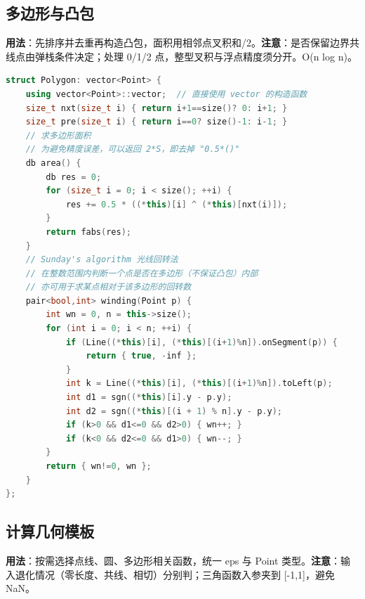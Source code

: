 \documentclass[a4paper,9pt]{extarticle}
\begin{document}
\subsection{多边形与凸包}

\textbf{用法}：先排序并去重再构造凸包，面积用相邻点叉积和/\allowbreak{}2。\textbf{注意}：是否保留边界共线点由弹栈条件决定；处理 0/\allowbreak{}1/\allowbreak{}2 点，整型叉积与浮点精度须分开。O(\allowbreak{}n log n)。

\begin{lstlisting}[language={C++}]
struct Polygon: vector<Point> {
    using vector<Point>::vector;  // 直接使用 vector 的构造函数
    size_t nxt(size_t i) { return i+1==size()? 0: i+1; }
    size_t pre(size_t i) { return i==0? size()-1: i-1; }
	// 求多边形面积
	// 为避免精度误差，可以返回 2*S，即去掉 "0.5*()"
	db area() {
        db res = 0;
        for (size_t i = 0; i < size(); ++i) {
            res += 0.5 * ((*this)[i] ^ (*this)[nxt(i)]);
        }
        return fabs(res);
    }
    // Sunday's algorithm 光线回转法
    // 在整数范围内判断一个点是否在多边形（不保证凸包）内部
    // 亦可用于求某点相对于该多边形的回转数
    pair<bool,int> winding(Point p) {
        int wn = 0, n = this->size();
        for (int i = 0; i < n; ++i) {
            if (Line((*this)[i], (*this)[(i+1)%n]).onSegment(p)) {
            	return { true, -inf };
            }
            int k = Line((*this)[i], (*this)[(i+1)%n]).toLeft(p);
            int d1 = sgn((*this)[i].y - p.y);
            int d2 = sgn((*this)[(i + 1) % n].y - p.y);
            if (k>0 && d1<=0 && d2>0) { wn++; }
            if (k<0 && d2<=0 && d1>0) { wn--; }
        }
        return { wn!=0, wn };
    }
};
\end{lstlisting}

\subsection{计算几何模板}

\textbf{用法}：按需选择点线、圆、多边形相关函数，统一 eps 与 Point 类型。\textbf{注意}：输入退化情况（零长度、共线、相切）分别判；三角函数入参夹到 [-1,1]，避免 NaN。
\end{document}
